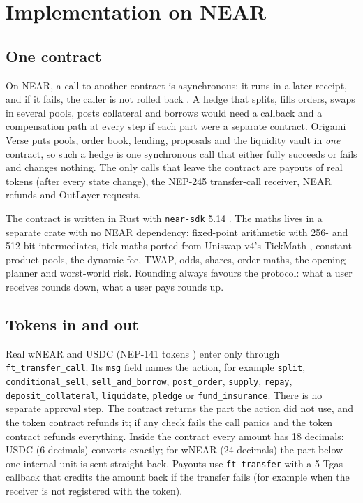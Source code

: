 \documentclass[11pt,a4paper]{article}
\newcommand{\code}[1]{\texttt{\small #1}}
\begin{document}
\section{Implementation on NEAR}
\label{sec:near}

\subsection{One contract}

On NEAR, a call to another contract is asynchronous: it runs in a later receipt, and if it fails, the caller is not
rolled back \cite{neardocs}. A hedge that splits, fills orders, swaps in several pools, posts collateral and borrows
would need a callback and a compensation path at every step if each part were a separate contract. Origami Verse puts
pools, order book, lending, proposals and the liquidity vault in \emph{one} contract, so such a hedge is one
synchronous call that either fully succeeds or fails and changes nothing. The only calls that leave the contract are
payouts of real tokens (after every state change), the NEP-245 transfer-call receiver, NEAR refunds and OutLayer
requests.

The contract is written in Rust with \code{near-sdk} 5.14 \cite{nearsdk}. The maths lives in a separate crate with no
NEAR dependency: fixed-point arithmetic with 256- and 512-bit intermediates, tick maths ported from Uniswap v4's
TickMath \cite{uniswapv4}, constant-product pools, the dynamic fee, TWAP, odds, shares, order maths, the opening
planner and worst-world risk. Rounding always favours the protocol: what a user receives rounds down, what a user
pays rounds up.

\subsection{Tokens in and out}

Real wNEAR and USDC (NEP-141 tokens \cite{nep141}) enter only through \code{ft\_transfer\_call}. Its \code{msg} field
names the action, for example \code{split}, \code{conditional\_sell}, \code{sell\_and\_borrow}, \code{post\_order},
\code{supply}, \code{repay}, \code{deposit\_collateral}, \code{liquidate}, \code{pledge} or \code{fund\_insurance}.
There is no separate approval step. The contract returns the part the action did not use, and the token contract
refunds it; if any check fails the call panics and the token contract refunds everything. Inside the contract every
amount has 18 decimals: USDC (6 decimals) converts exactly; for wNEAR (24 decimals) the part below one internal unit
is sent straight back. Payouts use \code{ft\_transfer} with a 5 Tgas callback that credits the amount back if the
transfer fails (for example when the receiver is not registered with the token).
\end{document}
